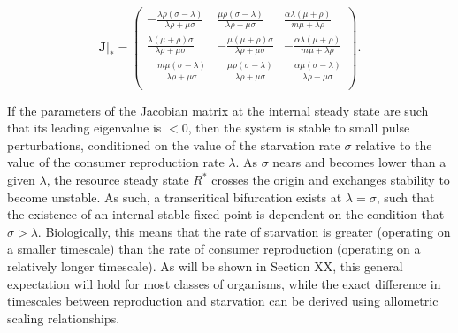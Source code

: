 \documentclass[12pt,english]{article}
\begin{document}
\begin{spacing}{1.9}
\begin{equation}
\mathbf{J}|_* =
\left(
\begin{array}{ccc}
 -\frac{\lambda  \rho  (\sigma - \lambda )}{\lambda  \rho +\mu  \sigma } & \frac{\mu  \rho  (\sigma -\lambda )}{\lambda  \rho +\mu  \sigma } & \frac{\alpha  \lambda  (\mu +\rho )}{m \mu +\lambda  \rho } \\
 \frac{\lambda  (\mu +\rho ) \sigma }{\lambda  \rho +\mu  \sigma } & -\frac{\mu  (\mu +\rho ) \sigma }{\lambda  \rho +\mu  \sigma } & -\frac{\alpha  \lambda  (\mu +\rho )}{m \mu +\lambda  \rho } \\
 -\frac{m \mu  (\sigma - \lambda)}{\lambda  \rho +\mu  \sigma } & -\frac{\mu  \rho  (\sigma - \lambda )}{\lambda  \rho +\mu  \sigma } & -\frac{\alpha  \mu  (\sigma - \lambda)}{\lambda  \rho +\mu  \sigma } \\
\end{array}
\right).
\end{equation}


If the parameters of the Jacobian matrix at the internal steady state are such that its leading eigenvalue is $<0$, then the system is stable to small pulse perturbations, conditioned on the value of the starvation rate $\sigma$ relative to the value of the consumer reproduction rate $\lambda$.
As $\sigma$ nears and becomes lower than a given $\lambda$, the resource steady state $R^*$ crosses the origin and exchanges stability to become unstable.
As such, a transcritical bifurcation exists at $\lambda = \sigma$, such that the existence of an internal stable fixed point is dependent on the condition that $\sigma > \lambda$.
Biologically, this means that the rate of starvation is greater (operating on a smaller timescale) than the rate of consumer reproduction (operating on a relatively longer timescale).
As will be shown in Section XX, this general expectation will hold for most classes of organisms, while the exact difference in timescales between reproduction and starvation can be derived using allometric scaling relationships.



\end{spacing}
\end{document}
